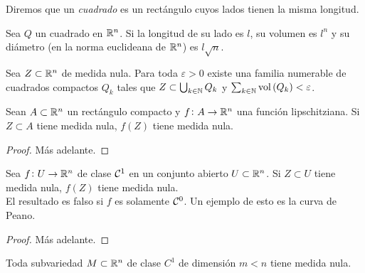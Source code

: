 \begin{defi}
    Diremos que un \textit{cuadrado} es un rectángulo cuyos lados tienen la misma
    longitud.
\end{defi}
\begin{prop*}
    Sea $Q$ un cuadrado en $\mathbb{R} ^n$. Si la longitud de su lado es $l$, su volumen
    es $l^n$ y su diámetro (en la norma euclideana de $\mathbb{R}^n$) es $l\sqrt{n}$.
\end{prop*}
\begin{prop}
    Sea $Z \subset \mathbb{R}^n$ de medida nula. Para toda $\varepsilon >0$ existe una
    familia numerable de cuadrados compactos $Q_k$ tales que $Z\subset
    \bigcup_{k \in \mathbb{N}} Q_k$ y $\sum_{k \in \mathbb{N}} \operatorname{vol} \left( Q_k \right) <
    \varepsilon$.
\end{prop}
\begin{lema}
    Sean $A\subset \mathbb{R}^n$ un rectángulo compacto y $f\colon A \to \mathbb{R}^n$ una
    función lipschitziana. Si $Z \subset A$ tiene medida nula, $f\left(Z \right)$
    tiene medida nula.
\end{lema}
\begin{proof}
    Más adelante.
\end{proof}
\begin{prop}
    Sea $f \colon U \to \mathbb{R}^n$ de clase $\mathcal{C} ^1$ en un conjunto abierto $U \subset
    \mathbb{R} ^n$. Si $Z \subset U$ tiene medida nula, $f\left( Z \right) $ tiene
    medida nula.\\
    El resultado es falso si $f$ es solamente $\mathcal{C} ^0$. Un ejemplo de esto es la
    curva de Peano.
\end{prop}
\begin{proof}
    Más adelante.
\end{proof}
\begin{col}
    Toda subvariedad $M \subset \mathbb{R}^n$ de clase $C^1$ de dimensión $m<n$ tiene
    medida nula.
\end{col}

